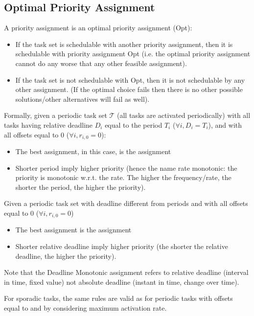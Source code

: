 \subsection{Optimal Priority Assignment}

A priority assignment is an optimal priority assignment (Opt):
\begin{itemize}
\item If the task set is schedulable with another priority assignment, then it is schedulable with priority assignment Opt (i.e. the optimal priority assignment cannot do any worse that any other feasible assignment).
\item If the task set is not schedulable with Opt, then it is not schedulable by any other assignment. (If the optimal choice fails then there is no other possible solutions/other alternatives will fail as well).
\end{itemize}

Formally, given a periodic task set $\mathcal{T}$ (all tasks are activated periodically) with all tasks having relative deadline $D_i$ equal to the period $T_i$ ($\forall i, D_i = T_i$), and with all offsets equal to 0 ($\forall i, r_{i,0} = 0$):
\begin{itemize}
\item The best assignment, in this case, is the  assignment
\item Shorter period imply higher priority (hence the name rate monotonic: the priority is monotonic w.r.t. the rate. The higher the frequency/rate, the shorter the period, the higher the priority).
\end{itemize}

Given a periodic task set with deadline different from periods and with all offsets equal to 0 ($\forall i, r_{i,0} = 0$)
\begin{itemize}
\item The best assignment is the  assignment
\item Shorter relative deadline imply higher priority (the shorter the relative deadline, the higher the priority).
\end{itemize}
Note that the Deadline Monotonic assignment refers to relative deadline (interval in time, fixed value) not absolute deadline (instant in time, change over time).

For sporadic tasks, the same rules are valid as for periodic tasks with offsets equal to  and by considering maximum activation rate.

